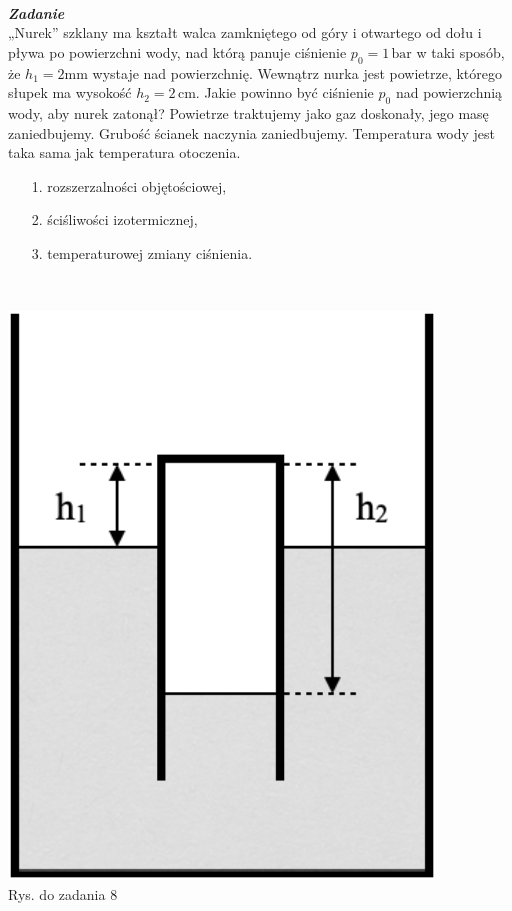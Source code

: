 \documentclass[11pt,a4paper]{article}
\newcounter{zadanie}\newcommand{\zadanie}[1][]{\addtocounter{zadanie}{1} ~\\  {\bf \emph{Zadanie \arabic{zadanie} #1 }} \\}
\begin{document}
\begin{minipage}{0.75\textwidth}
\zadanie
„Nurek” szklany ma kształt walca zamkniętego od góry i otwartego od dołu i pływa po powierzchni wody, nad którą panuje ciśnienie $p_0 = 1\,\textrm{bar}$ w taki sposób, że $h_1 = 2\textrm{mm}$ wystaje nad powierzchnię. Wewnątrz nurka jest powietrze, którego słupek ma wysokość $h_2 = 2\,\textrm{cm}$.
Jakie powinno być ciśnienie $p_0$ nad powierzchnią wody, aby nurek zatonął? Powietrze traktujemy jako gaz doskonały, jego masę zaniedbujemy. Grubość ścianek naczynia zaniedbujemy. Temperatura wody jest taka sama jak temperatura otoczenia.

\begin{itemize}
\item[1.] rozszerzalności objętościowej,
\item[2.] ściśliwości izotermicznej,
\item[3.] temperaturowej zmiany ciśnienia.
\end{itemize}
\phantom{.} \\
\end{minipage}
\begin{minipage}{0.25\textwidth}
\begin{center}

\includegraphics[width=0.85\textwidth]{zadanie8.png}\\
Rys. do zadania 8
\end{center}
\end{minipage}
\end{document}
